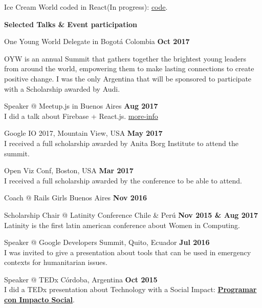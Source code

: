 \documentclass[margin,line]{resume}
\begin{document}
\begin{resume}
\begin{list2}
\item Ice Cream World coded in React(In progress): \href{https://github.com/carohadad/icecream-world}{code}.
\end{list2}


\textbf{Selected Talks \& Event participation}

\begin{list2}

\item One Young World Delegate in Bogot\'a Colombia \hfill \textbf{Oct 2017}

OYW is an annual Summit that gathers together the brightest young leaders from around the world, empowering them to make lasting connections to create positive change.  I was the only Argentina that will be sponsored to participate with a Scholarship awarded by Audi.


\item Speaker @ Meetup.js in Buenos Aires \hfill \textbf{Aug 2017}
\\
I did a talk about Firebase + React.js. \href{https://www.meetup.com/Meetup-js/events/242439836/?eventId=242439836}{more-info}

\item Google IO 2017, Mountain View, USA \hfill \textbf{May 2017}
\\
I received a full scholarship awarded by Anita Borg Institute to attend the summit.


\item Open Viz Conf, Boston, USA \hfill \textbf{Mar 2017}
\\ I received a full scholarship awarded by the conference to be able to attend.

\item Coach  @ Rails Girls Buenos Aires \hfill \textbf{Nov 2016}

\item Scholarship Chair  @ Latinity Conference Chile \& Per\'u \hfill \textbf{Nov 2015 \& Aug 2017}\\
Latinity is the first latin american conference about Women in Computing.

\item Speaker @ Google Developers Summit, Quito, Ecuador \hfill \textbf{Jul 2016}  \\
I was invited to give a presentation about tools that can be used in emergency contexts for humanitarian issues.

\item Speaker @ TEDx C\'ordoba, Argentina \hfill \textbf{Oct 2015}  \\
I did a TEDx presentation about Technology with a Social Impact: \href{https://www.youtube.com/watch?v=0cx8UwdN-g4&t=1s}{\textbf{Programar con Impacto Social}}.


\end{list2}
\end{resume}
\end{document}
